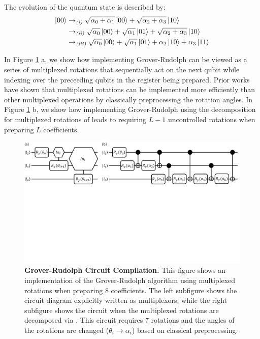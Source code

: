 The evolution of the quantum state is described by:
\begin{equation}
    \begin{split}
        \ket{00} &\rightarrow_{\textit{(i)}} \sqrt{\alpha_0 + \alpha_1} \ket{00} + \sqrt{\alpha_2 + \alpha_3} \ket{10} \\
        &\rightarrow_{\textit{(ii)}} \sqrt{\alpha_0} \ket{00} + \sqrt{\alpha_1} \ket{01} + \sqrt{\alpha_2 + \alpha_3} \ket{10} \\
        &\rightarrow_{\textit{(iii)}} \sqrt{\alpha_0} \ket{00} + \sqrt{\alpha_1} \ket{01} + \alpha_2 \ket{10} + \alpha_3 \ket{11}
    \end{split}
\end{equation}

In Figure \ref{fig:grover-rudolph} a, we show how implementing Grover-Rudolph can be viewed as a series of multiplexed rotations that sequentially act on the next qubit while indexing over the preceeding qubits in the register being prepared.
Prior works \cite{mottonen2004transformation, low2021halving} have shown that multiplexed rotations can be implemented more efficiently than other multiplexed operations by classically preprocessing the rotation angles. 
In Figure \ref{fig:grover-rudolph} b, we show how implementing Grover-Rudolph using the decomposition for multiplexed rotations of \cite{mottonen2004transformation} leads to requiring $L-1$ uncontrolled rotations when preparing $L$ coefficients.

\begin{figure}
    \centering
    \includegraphics[width=16cm]{figures/grover-rudolph.pdf}
    \caption{
        \textbf{Grover-Rudolph Circuit Compilation.} 
        This figure shows an implementation of the Grover-Rudolph algorithm using multiplexed rotations when preparing 8 coefficients.
        The left subfigure shows the circuit diagram explicitly written as multiplexors, while the right subfigure shows the circuit when the multiplexed rotations are decomposed via \cite{mottonen2004transformation}.
        This circuit requires 7 rotations and the angles of the rotations are changed ($\theta_i \rightarrow \alpha_i$) based on classical preprocessing.
    }
    \label{fig:grover-rudolph}
\end{figure}
